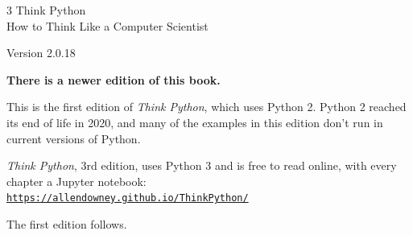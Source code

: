 \documentclass[10pt]{book}
\newcommand{\theversion}{2.0.18}
\newcommand{\thedate}{}
\begin{document}
\begin{latexonly}

\renewcommand{\blankpage}{\thispagestyle{empty} \quad \newpage}



\thispagestyle{empty}

\begin{flushright}
\vspace*{2.0in}

\begin{spacing}{3}
{\huge Think Python}\\
{\Large How to Think Like a Computer Scientist}
\end{spacing}

\vspace{0.25in}

Version \theversion

\thedate

\vfill

\end{flushright}

\begin{flushleft}
{\large\bfseries There is a newer edition of this book.}

\vspace{0.5em}
This is the first edition of \emph{Think Python}, which uses Python 2.
Python 2 reached its end of life in 2020, and many of the examples in
this edition don't run in current versions of Python.

\vspace{0.5em}
\emph{Think Python}, 3rd edition, uses Python 3 and is free to read
online, with every chapter a Jupyter notebook:\\
\href{https://allendowney.github.io/ThinkPython/}{\nolinkurl{https://allendowney.github.io/ThinkPython/}}

\vspace{0.5em}
The first edition follows.
\end{flushleft}


\blankpage
\blankpage

\pagebreak
\thispagestyle{empty}


\end{latexonly}
\end{document}
